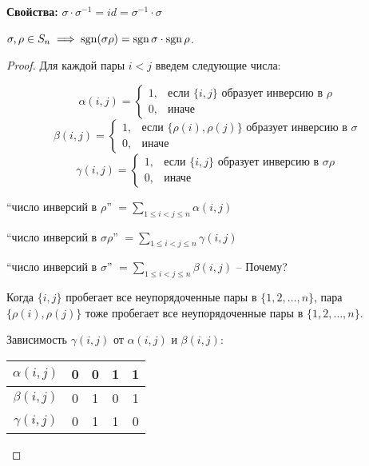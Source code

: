 \textbf{Свойства:}
$\sigma \cdot \sigma^{-1} = id = \sigma^{-1} \cdot \sigma$

\begin{theorem}
    $\sigma, \rho \in S_n \implies \operatorname{\mathop{\mathrm{sgn}}}(\sigma \rho) = \operatorname{\mathop{\mathrm{sgn}}} \sigma \cdot \operatorname{\mathop{\mathrm{sgn}}} \rho$.
\end{theorem}

\begin{proof}
    Для каждой пары $i < j$ введем следующие числа:

    \begin{equation*}
        \alpha(i,j) = \begin{cases}
            1, &\text{если } \{i, j\} \text{ образует инверсию в } \rho \\
            0, &\text{иначе}
        \end{cases}
    \end{equation*}
    \begin{equation*}
        \beta(i,j) = \begin{cases}
            1, &\text{если }  \{\rho(i), \rho(j)\} \text{ образует инверсию в } \sigma \\
            0, &\text{иначе}
        \end{cases}
    \end{equation*}
    \begin{equation*}
        \gamma(i,j) = \begin{cases}
            1, &\text{если }  \{i, j\} \text{ образует инверсию в } \sigma \rho \\
            0, &\text{иначе}
        \end{cases}
    \end{equation*}

    \everymath{\displaystyle}

    ``число инверсий в $\rho$'' $= \sum_{1 \leq i < j \leq n} \alpha(i, j) $

    ``число инверсий в $\sigma \rho$'' $= \sum_{1 \leq i < j \leq n} \gamma(i, j) $

    ``число инверсий в $\sigma$'' $= \sum_{1 \leq i < j \leq n} \beta(i, j)$ -- Почему?

    Когда $\{i, j\}$ пробегает все неупорядоченные пары в $\{1, 2, \dots, n\}$, пара $\{\rho(i), \rho(j)\}$ тоже пробегает все неупорядоченные пары в $\{1, 2, \dots, n\}$.

    \bigskip
    Зависимость $\gamma(i,j)$ от $\alpha(i,j)$ и $\beta(i,j)$:
    \begin{table}[!ht]
        \begin{center}
            \begin{tabular}{c|c|c|c|c}
                $\alpha(i,j)$ & 0 & 0 & 1 & 1 \\
                \hline
                $\beta(i,j)$ & 0 & 1 & 0 & 1 \\
                \hline
                $\gamma(i,j)$ & 0 & 1 & 1 & 0 \\
            \end{tabular}
        \end{center}
    \end{table}


\end{proof}
